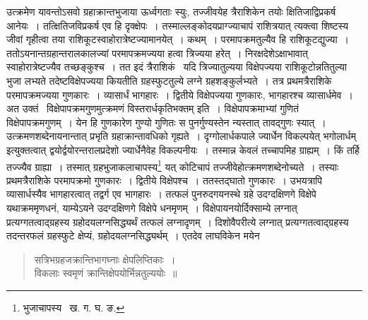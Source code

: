 \documentclass[11pt, openany]{book}
\begin{document}
\noindent उत्क्रमेण यावन्तोऽसवो ग्रहाक्रान्तभुजाया ऊर्ध्वगताः स्युः, तज्जीवयेह त्रैराशिकेन तयोः क्षितिजाद्विप्रकर्ष आनेयः~। तत्क्षितिजविप्रकर्ष एव हि दृक्क्षेपः~। तस्माल्लङ्कोदयप्राग्ज्याचापं राशित्रयात् त्यक्त्वा शिष्टस्य जीवां गृहीत्वा तया राशिकूटस्वाहोरात्रेष्टज्यामानयेत्~। कथम्~। परमापक्रमतुल्यैव हि राशिकूटद्युज्या~। ततोऽयनान्तग्रहान्तरालकालज्यां परमापक्रमज्यया हत्वा त्रिज्यया हरेत्~। निरक्षदेशेऽक्षाभावात् स्वाहोरात्रेष्टज्यैव तच्छङ्कुश्च~। तत इदं त्रैराशिकं \textendash\ यदि त्रिज्यातुल्यया विक्षेपज्यया राशिकूटोन्नतितुल्या भुजा लभ्यते तदेष्टविक्षेपज्यया कियतीति ग्रहस्फुटतुल्ये लग्ने ग्रहशङ्कुर्लभ्यते~। तत्र प्रथमत्रैराशिके परमापक्रमज्यया गुणकारः~। व्यासार्धं भागहारः~। द्वितीये विक्षेपज्यया गुणकारः, भागहारश्च व्यासार्धमेव~। अत उक्तं \textendash\ {\qt विक्षेपापक्रमगुणमुत्क्रमणं विस्तरार्धकृतिभक्तम्} इति~। 
विक्षेपापक्रमाभ्यां गुणितं विक्षेपापक्रमगुणम्~। येन हि गुणकारेण गुण्यो गुणितः स पुनर्गुण्यस्तेन न्यस्तात् तावद्गुणः स्यात्~। उत्क्रमणशब्देनायनान्तात् प्रभृति ग्रहाक्रान्तावधिको गृह्यते~। {\qt दृग्गोलार्धकपाले ज्यार्धेन विकल्पयेत् भगोलार्धम्} इत्युक्तत्वात्
द्वयोर्द्वयोरन्तरालप्रदेशो ज्यार्धेनैवेह विकल्पनीयः~। तस्मान्न केवलं तच्चापमिह ग्राह्यम्~। किं तर्हि तज्ज्यैव ग्राह्या~। तस्मात् ग्रहभुजाकलाचापस्य\renewcommand{\thefootnote}{१}\footnote{भुजाचापस्य \textendash\ ख. ग. घ. ङ.} यत् कोटिचापं तज्जीवेहोत्क्रमणशब्देनोच्यते~। तस्याः प्रथमत्रैराशिके परमापक्रमो गुणकारः~। द्वितीये विक्षेपश्च~। ततस्तद्घातो गुणकारः~। उभयत्रापि
व्यासार्धस्यैव भागहारत्वात् तद्वर्ग एव भागहारः~। तत्फलं पुनरुदगयनस्थे ग्रहे उदग्दक्षिणगे विक्षेपे यथाक्रममृणधनं, याम्येऽयने 
उदग्दक्षिणगे विक्षेपे धनमृणम्~। विक्षेपायनयोर्दिक्साम्ये लग्नात् प्रत्यग्गतत्वाद्ग्रहस्य ग्रहोदयलग्नसिद्ध्यर्थं तत्फलं लग्नादृणम्~। दिशोवैपरीत्ये लग्नात् प्रत्यग्गतत्वाद्ग्रहस्य तदन्तरफलं ग्रहस्फुटे क्षेप्यं, ग्रहोदयलग्नसिद्ध्यर्थम्~। एतदेव लाघविकेन मयेन\textendash  

\newpage

\begin{quote}
{\qt सत्रिभग्रहजक्रान्तिभागघ्नाः क्षेपलिप्तिकाः~।\\
विकलाः स्वमृणं क्रान्तिक्षेपयोर्भिन्नतुल्ययोः~॥}
\end{quote}
\end{document}
